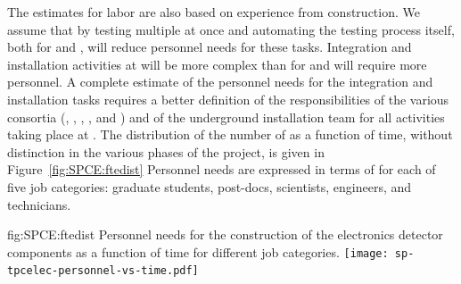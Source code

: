 The estimates for labor are also based on 
experience from  construction. We assume that by testing multiple 
at once and automating the testing process itself,
both for  and , will reduce personnel needs for these tasks. 
Integration and installation activities at 
will be more complex than for  and
will require more personnel. A complete estimate of the
personnel needs for the integration and installation tasks
requires a better definition of the responsibilities of
the various consortia (, , ,
, and ) and of the underground
installation team for all activities taking place
at . The distribution of the number of
 as a function of time, without distinction in the various
phases of the project, is given in Figure~\ref{fig:SPCE:ftedist}
Personnel needs are expressed in terms of 
for each of five job categories: graduate students,
post-docs, scientists, engineers, and technicians. 

\begin{dunefigure}
{fig:SPCE:ftedist}
	{Personnel needs for the construction of the  electronics detector components 
as a function of time for different job categories.}
\texttt{[image: sp-tpcelec-personnel-vs-time.pdf]}
\end{dunefigure}
